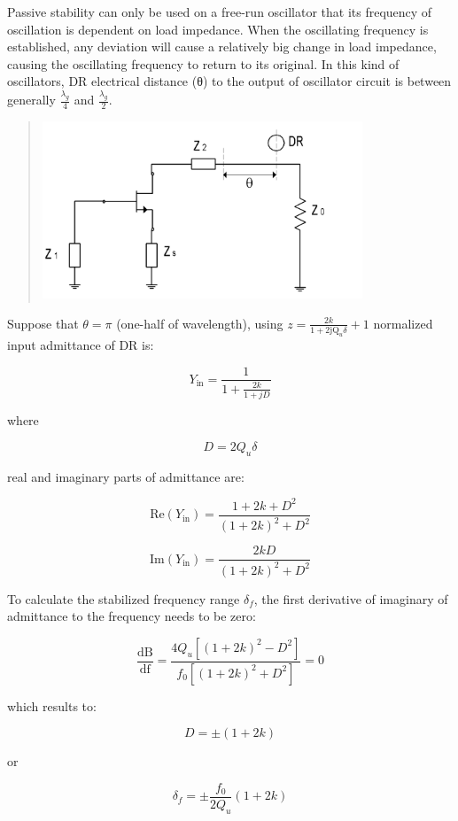 Passive stability can only be used on a free-run oscillator that its
frequency of oscillation is dependent on load impedance. When the
oscillating frequency is established, any deviation will cause a
relatively big change in load impedance, causing the oscillating
frequency to return to its original. In this kind of oscillators, DR
electrical distance (θ) to the output of oscillator circuit is between
generally \(\frac{\lambda_{g}}{4}\) and \(\frac{\lambda_{g}}{2}\).

\begin{quote}
\includegraphics[width=3.76389in,height=2.08333in]{media/image12.png}
\end{quote}

Suppose that \(\theta = \pi\) (one-half of wavelength), using
\(z = \frac{2k}{1 + 2\text{jQ}_{u}\delta} + 1\) normalized input
admittance of DR is:

\[Y_{\text{in}} = \frac{1}{1 + \frac{2k}{1 + jD}}\]

where

\[D = 2Q_{u}\delta\]

real and imaginary parts of admittance are:

\[\text{Re}\left( Y_{\text{in}} \right) = \frac{1 + 2k + D^{2}}{\left( 1 + 2k \right)^{2} + D^{2}}\]

\[\text{Im}\left( Y_{\text{in}} \right) = \frac{2kD}{\left( 1 + 2k \right)^{2} + D^{2}}\]

To calculate the stabilized frequency range \(\delta_{f}\), the first
derivative of imaginary of admittance to the frequency needs to be zero:

\[\frac{\text{dB}}{\text{df}} = \frac{4Q_{u}\left\lbrack \left( 1 + 2k \right)^{2} - D^{2} \right\rbrack}{f_{0}\left\lbrack \left( 1 + 2k \right)^{2} + D^{2} \right\rbrack} = 0\]

which results to:

\[D = \pm \left( 1 + 2k \right)\]

or

\[\delta_{f} = \pm \frac{f_{0}}{2Q_{u}}\left( 1 + 2k \right)\]

